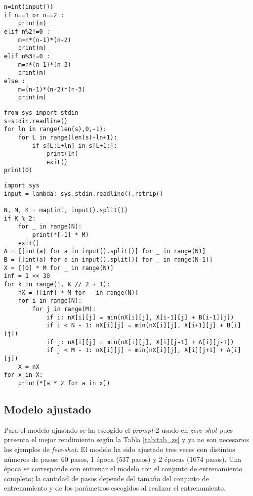 \documentclass[12pt,twoside]{article}
\begin{document}
\begin{tcolorbox}[
  colback=gray!5,
  colframe=black,
  boxrule=0.5pt,
  breakable,
  title=$\mathcal{O}(1)$ catalogado correctamente,
]
\begin{verbatim}
n=int(input())
if n==1 or n==2 :
    print(n)
elif n%2!=0 :
    m=n*(n-1)*(n-2)
    print(m)
elif n%3!=0 :
    m=n*(n-1)*(n-3)
    print(m)
else :
    m=(n-1)*(n-2)*(n-3)
    print(m)
\end{verbatim}
\end{tcolorbox}

\begin{tcolorbox}[
  colback=gray!5,
  colframe=black,
  boxrule=0.5pt,
  breakable,
  title=$\mathcal{O}(n^3)$ catalogado como $\mathcal{O}(n^2)$,
]
\begin{verbatim}
from sys import stdin
s=stdin.readline()
for ln in range(len(s),0,-1):
    for L in range(len(s)-ln+1):
        if s[L:L+ln] in s[L+1:]:
            print(ln)
            exit()
print(0)
\end{verbatim}
\end{tcolorbox}

\begin{tcolorbox}[
  colback=gray!5,
  colframe=black,
  boxrule=0.5pt,
  breakable,
  title=$\mathcal{O}(n^3)$ catalogado correctamente,
]
\begin{verbatim}
import sys
input = lambda: sys.stdin.readline().rstrip()

N, M, K = map(int, input().split())
if K % 2:
    for _ in range(N):
        print(*[-1] * M)
    exit()
A = [[int(a) for a in input().split()] for _ in range(N)]
B = [[int(a) for a in input().split()] for _ in range(N-1)]
X = [[0] * M for _ in range(N)]
inf = 1 << 30
for k in range(1, K // 2 + 1):
    nX = [[inf] * M for _ in range(N)]
    for i in range(N):
        for j in range(M):
            if i: nX[i][j] = min(nX[i][j], X[i-1][j] + B[i-1][j])
            if i < N - 1: nX[i][j] = min(nX[i][j], X[i+1][j] + B[i][j])
            if j: nX[i][j] = min(nX[i][j], X[i][j-1] + A[i][j-1])
            if j < M - 1: nX[i][j] = min(nX[i][j], X[i][j+1] + A[i][j])
    X = nX
for x in X:
    print(*[a * 2 for a in x])
\end{verbatim}
\end{tcolorbox}

\subsection{Modelo ajustado}

Para el modelo ajustado se ha escogido el \textit{prompt} 2 usado en \textit{zero-shot} pues presenta el mejor rendimiento según la Tabla \ref{tab:tab_zs} y ya no son necesarios los ejemplos de \textit{few-shot}. El modelo ha sido ajustado tres veces con distintos números de pasos: 60 pasos, 1 época (537 pasos) y 2 épocas (1074 pasos). Una época se corresponde con entrenar el modelo con el conjunto de entrenamiento completo; la cantidad de pasos depende del tamaño del conjunto de entrenamiento y de los parámetros escogidos al realizar el entrenamiento.
\end{document}
